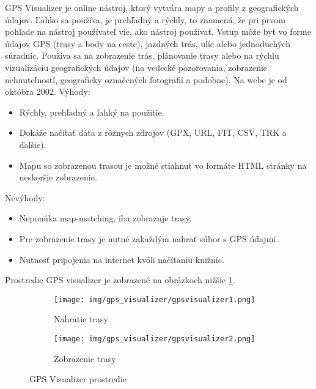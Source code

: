\indent \indent GPS Visualizer je online nástroj, ktorý vytvára mapy a profily z geografických údajov. Ľahko sa používa, je prehľadný a rýchly, to znamená, že pri prvom pohľade na nástroj používateľ vie, ako nástroj používať. Vstup môže byť vo forme údajov GPS (trasy a body na ceste), jazdných trás, ulíc alebo jednoduchých súradníc. Používa sa na zobrazenie trás, plánovanie trasy alebo na rýchlu vizualizáciu geografických údajov (na vedecké pozorovania, zobrazenie nehnuteľností, geograficky označených fotografií a podobne). Na webe je od októbra 2002\cite{gps_visualizer}. Výhody:
\begin{itemize}
  \item Rýchly, prehľadný a ľahký na použitie.
  \item Dokáže načítať dáta z rôznych zdrojov (GPX, URL, FIT, CSV, TRK a ďalšie).
  \item Mapu so zobrazenou trasou je možné stiahnuť vo formáte HTML stránky na neskoršie zobrazenie.
\end{itemize}
Nevýhody:
\begin{itemize}
  \item Neponúka map-matching, iba zobrazuje trasy.
  \item Pre zobrazenie trasy je nutné zakaždým nahrať súbor s GPS údajmi.
  \item Nutnosť pripojenia na internet kvôli načítaniu knižníc.
\end{itemize}
Prostredie GPS visualizer je zobrazené na obrázkoch nižšie \ref{fig:gps-visualizer}.
\begin{figure}[H]
  \centering
  \begin{subfigure}{.7\textwidth}
    \centering
    \texttt{[image: img/gps\_visualizer/gpsvisualizer1.png]}
    \caption{Nahratie trasy}
  \end{subfigure}
  \begin{subfigure}{.7\textwidth}
    \centering
    \texttt{[image: img/gps\_visualizer/gpsvisualizer2.png]}
    \caption{Zobrazenie trasy}
  \end{subfigure}
  \caption{GPS Visualizer prostredie}
  \label{fig:gps-visualizer}
\end{figure}

